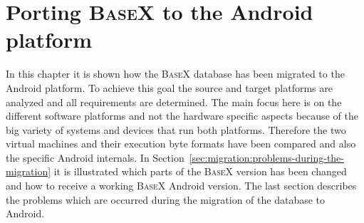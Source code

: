 \chapter{Porting \textsc{BaseX} to the Android platform}
\label{sec:migration:porting-basex-to-android}
In this chapter it is shown how the \textsc{BaseX} database has been migrated to the Android platform.
To achieve this goal the source and target platforms are analyzed and all requirements are determined.
The main focus here is on the different software platforms and not the hardware specific aspects because of the big variety of systems and devices that run both platforms. 
Therefore the two virtual machines and their execution byte formats have been compared and also the specific Android internals.
In Section~\ref{sec:migration:problems-during-the-migration} it is illustrated which parts of the \textsc{BaseX} version has been changed and how to receive a working \textsc{BaseX} Android version.
The last section describes the problems which are occurred during the migration of the database to Android.


